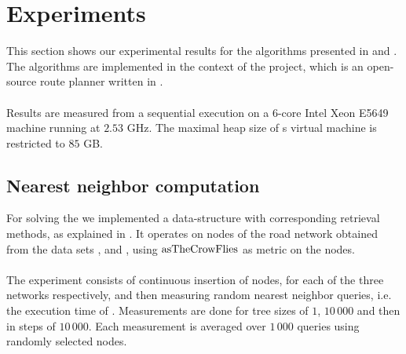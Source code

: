 \section{Experiments}
	This section shows our experimental results for the algorithms presented in 
	and . The algorithms are implemented in the context of the \cobweb {} project,
	which is an open-source \multiModal route planner written in \java.\\\\
	Results are measured from a sequential execution on a $6$-core Intel Xeon E5649 machine running at $2.53$ GHz.
	The maximal heap size of {\java}s virtual machine is restricted to $85$ GB.

\subsection{Nearest neighbor computation}
	For solving the \nearestNeighborProblem we implemented a \coverTree data-structure with corresponding retrieval methods,
	as explained in . It operates on nodes of the road network obtained from the data sets
	\freiburgR, \stuttgartR and \switzerlandR, using $\operatorname{asTheCrowFlies}$ as metric on the nodes.\\\\
	The experiment consists of continuous insertion of nodes, for each of the three networks respectively, and then measuring
	random nearest neighbor queries, i.e. the execution time of . Measurements are done for tree sizes
	of $1$, $10\,000$ and then in steps of $10\,000$. Each measurement is averaged over $1\,000$ queries using randomly selected nodes.\\
